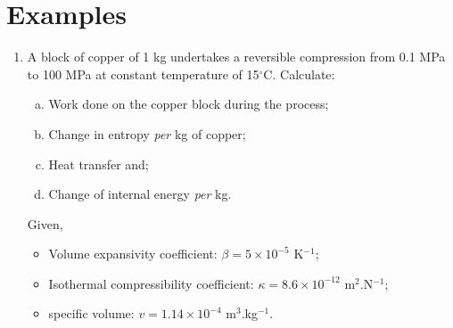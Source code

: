 \clearpage

\section{Examples}

\begin{enumerate}[1)]
\item\label{Mod03Ex01} A block of copper of 1 kg undertakes a reversible compression from 0.1 MPa to 100 MPa at constant temperature of 15$^{\circ}$C. Calculate:
    \begin{enumerate}[a)]
       \item Work done on the copper block during the process;
       \item Change in entropy {\it per} kg of copper;
       \item Heat transfer and;
       \item Change of internal energy {\it per} kg.
    \end{enumerate}
    Given, 
    \begin{itemize}
       \item Volume expansivity coefficient: $\beta = 5\times 10^{-5}$ K$^{-1}$;
       \item Isothermal compressibility coefficient: $\kappa = 8.6\times 10^{-12}$ m$^{2}$.N$^{-1}$;
       \item specific volume: $v=1.14\times 10^{-4}$ m$^{3}$.kg$^{-1}$.
    \end{itemize} 


\end{enumerate}
